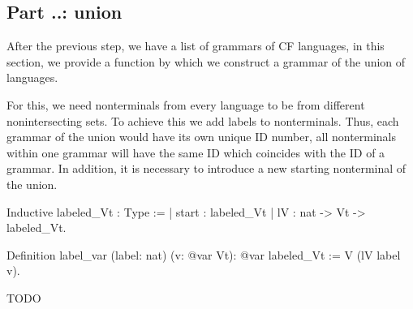 



\subsection{Part ..: union}

After the previous step, we have a list of grammars of CF languages, in this section, we provide a function by which we construct a grammar of the union of languages.

For this, we need nonterminals from every language to be from different nonintersecting sets. To achieve this we add labels to nonterminals. Thus, each grammar of the union would have its own unique ID number, all nonterminals within one grammar will have the same ID which coincides with the ID of a grammar. In addition, it is necessary to introduce a new starting nonterminal of the union.

\begin{listing}[h]
    \begin{pyglist}[language=coq, numbers=none, numbersep=5pt]
  Inductive labeled_Vt : Type :=
  | start : labeled_Vt
  | lV : nat -> Vt -> labeled_Vt.
  
  Definition label_var (label: nat) 
                       (v: @var Vt): @var 
                       labeled_Vt :=
    V (lV label v).  
    \end{pyglist}
    \caption{TODO}
    \label{lst:verbments1}
\end{listing}

